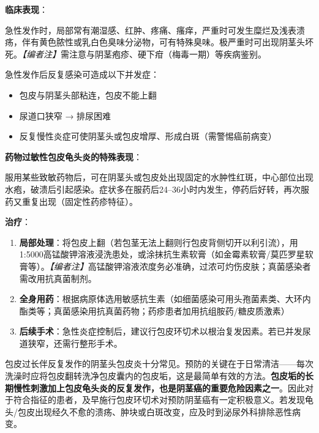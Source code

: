 \vspace{0.5em}
\noindent\textbf{临床表现}：

急性发作时，局部常有潮湿感、红肿、疼痛、瘙痒，严重时可发生糜烂及浅表溃疡，伴有黄色脓性或乳白色臭味分泌物，可有特殊臭味。极严重时可出现阴茎头坏死。\textit{【编者注】}需注意与阴茎疱疹、硬下疳（梅毒一期）等疾病鉴别。

急性发作后反复感染可造成以下并发症：
\begin{itemize}
	\item 包皮与阴茎头部粘连，包皮不能上翻
	\item 尿道口狭窄 → 排尿困难
	\item 反复慢性炎症可使阴茎头或包皮增厚、形成白斑（需警惕癌前病变）
\end{itemize}

\vspace{0.5em}
\noindent\textbf{药物过敏性包皮龟头炎的特殊表现}：

服用某些致敏药物后，可在阴茎头或包皮处出现固定的水肿性红斑，中心部位出现水疱，破溃后引起感染。症状多在服药后24--36小时内发生，停药后好转，再次服药又重复出现（固定性药疹特征）。

\vspace{0.5em}
\noindent\textbf{治疗}：
\begin{enumerate}
	\item \textbf{局部处理}：将包皮上翻（若包茎无法上翻则行包皮背侧切开以利引流），用1:5000高锰酸钾溶液浸洗患处，或涂抹抗生素软膏（如金霉素软膏/莫匹罗星软膏等）。\textit{【编者注】}高锰酸钾溶液浓度务必准确，过浓可灼伤皮肤；真菌感染者需改用抗真菌制剂。
	\item \textbf{全身用药}：根据病原体选用敏感抗生素（如细菌感染可用头孢菌素类、大环内酯类等；真菌感染用抗真菌药物；药疹患者加用抗组胺药/糖皮质激素）
	\item \textbf{后续手术}：急性炎症控制后，建议行包皮环切术以根治复发因素。若已并发尿道狭窄，还需行整形手术。
\end{enumerate}

\begin{tcolorbox}[colback=pink!5!white,colframe=red!50!black,title=贴心小叮咛]
包皮过长伴反复发作的阴茎头包皮炎十分常见。预防的关键在于日常清洁——每次洗澡时应将包皮翻转洗净包皮囊内的包皮垢，这是最简单有效的方法。\textbf{包皮垢的长期慢性刺激加上包皮龟头炎的反复发作，也是阴茎癌的重要危险因素之一}。因此对于符合指征的患者，及早施行包皮环切术对预防阴茎癌有一定积极意义。若发现龟头/包皮出现经久不愈的溃疡、肿块或白斑改变，应及时到泌尿外科排除恶性病变。
\end{tcolorbox}

